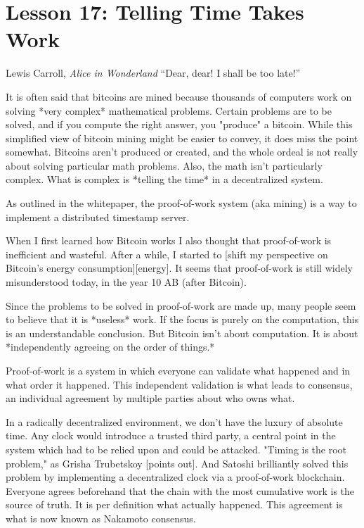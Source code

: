 \chapter{Lesson 17: Telling Time Takes Work}
\label{les:17}

\begin{chapquote}{Lewis Carroll, \textit{Alice in Wonderland}}
``Dear, dear! I shall be too late!''
\end{chapquote}

It is often said that bitcoins are mined because thousands of computers
work on solving *very complex* mathematical problems. Certain problems
are to be solved, and if you compute the right answer, you "produce" a
bitcoin. While this simplified view of bitcoin mining might be easier to
convey, it does miss the point somewhat. Bitcoins aren't produced or
created, and the whole ordeal is not really about solving particular
math problems. Also, the math isn't particularly complex. What is
complex is *telling the time* in a decentralized system.

As outlined in the whitepaper, the proof-of-work system (aka mining) is
a way to implement a distributed timestamp server.


When I first learned how Bitcoin works I also thought that proof-of-work
is inefficient and wasteful. After a while, I started to [shift my
perspective on Bitcoin's energy consumption][energy]. It seems that
proof-of-work is still widely misunderstood today, in the year 10 AB
(after Bitcoin).

Since the problems to be solved in proof-of-work are made up, many
people seem to believe that it is *useless* work. If the focus is purely
on the computation, this is an understandable conclusion. But Bitcoin
isn't about computation. It is about *independently agreeing on the
order of things.*

Proof-of-work is a system in which everyone can validate what happened
and in what order it happened. This independent validation is what leads
to consensus, an individual agreement by multiple parties about who owns
what.

In a radically decentralized environment, we don't have the luxury of
absolute time. Any clock would introduce a trusted third party, a
central point in the system which had to be relied upon and could be
attacked. "Timing is the root problem," as Grisha Trubetskoy [points
out]. And Satoshi brilliantly solved this problem by implementing a
decentralized clock via a proof-of-work blockchain. Everyone agrees
beforehand that the chain with the most cumulative work is the source of
truth. It is per definition what actually happened. This agreement is
what is now known as Nakamoto consensus.

